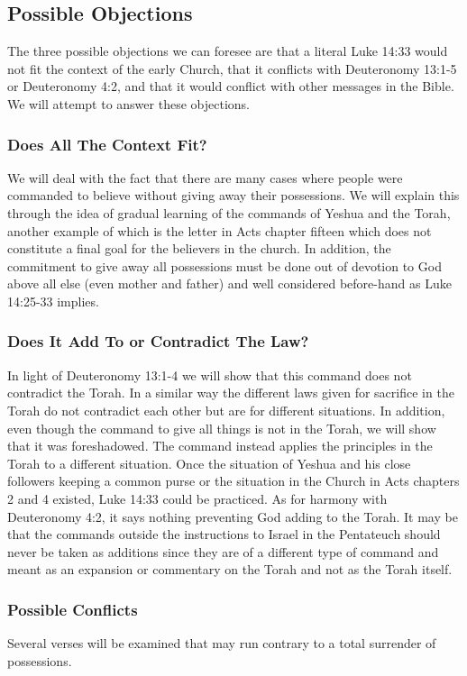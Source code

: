 \documentclass[11pt]{article}
\begin{document}
\subsection{Possible Objections}
The three possible objections we can foresee are that a literal Luke 14:33 would not fit the context of the early Church, that it conflicts with Deuteronomy 13:1-5 or Deuteronomy 4:2, and that it would conflict with other messages in the Bible. We will attempt to answer these objections.

\subsubsection{Does All The Context Fit?}
We will deal with the fact that there are many cases where people were commanded to believe without giving away their possessions. We will explain this through the idea of gradual learning of the commands of Yeshua and the Torah, another example of which is the letter in Acts chapter fifteen which does not constitute a final goal for the believers in the church. In addition, the commitment to give away all possessions must be done out of devotion to God above all else (even mother and father) and well considered before-hand as Luke 14:25-33 implies. 

\subsubsection{Does It Add To or Contradict The Law?}
In light of Deuteronomy 13:1-4 we will show that this command does not contradict the Torah. In a similar way the different laws given for sacrifice in the Torah do not contradict each other but are for different situations. In addition, even though the command to give all things is not in the Torah, we will show that it was foreshadowed. The command instead applies the principles in the Torah to a different situation. Once the situation of Yeshua and his close followers keeping a common purse or the situation in the Church in Acts chapters 2 and 4 existed, Luke 14:33 could be practiced. As for harmony with Deuteronomy 4:2, it says nothing preventing God adding to the Torah. It may be that the commands outside the instructions to Israel in the Pentateuch should never be taken as additions since they are of a different type of command and meant as an expansion or commentary on the Torah and not as the Torah itself.

\subsubsection{Possible Conflicts}
Several verses will be examined that may run contrary to a total surrender of possessions.
\end{document}
